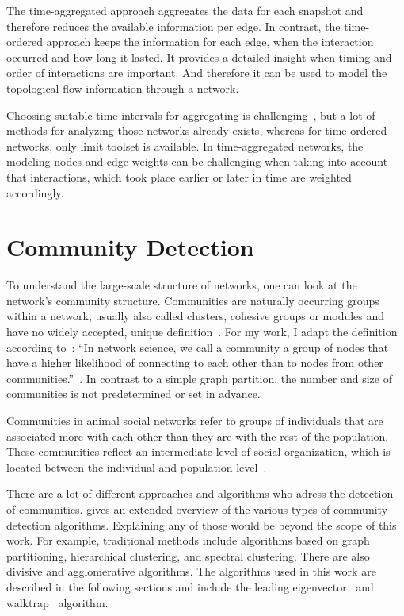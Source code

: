 The time-aggregated approach aggregates the data for each snapshot and therefore reduces the available information per edge. In contrast, the time-ordered approach keeps the information for each edge, when the interaction occurred and how long it lasted. It provides a detailed insight when timing and order of interactions are important.  And therefore it can be used to model the topological flow information through a network.

Choosing suitable time intervals for aggregating is challenging~\cite{Pinter-Wollman2014}, but a lot of methods for analyzing those networks already exists, whereas for time-ordered networks, only limit toolset is available. In time-aggregated networks, the modeling nodes and edge weights can be challenging when taking into account that interactions, which took place earlier or later in time are weighted accordingly.

\section{Community Detection}
To understand the large-scale structure of networks, one can look at the network's community structure. Communities are naturally occurring groups within a network, usually also called clusters, cohesive groups or modules and have no widely accepted, unique definition~\cite{palla2005uncovering}.
For my work, I adapt the definition according to~\textcite{barabasi2016network}: 
``In network science, we call a community a group of nodes that have a higher likelihood of connecting to each other than to nodes from other communities.''~\cite[p.~TODO]{barabasi2016network}. In contrast to a simple graph partition, the number and size of communities is not predetermined or set in advance.

Communities in animal social networks refer to groups of individuals that are associated more with each other than they are with the rest of the population. These communities reflect an intermediate level of social organization, which is located between the individual and population level~\cite{croft2008exploring}.

There are a lot of different approaches and algorithms who adress the detection of communities. \textcite{fortunato2010community} gives an extended overview of the various types of community detection algorithms.
Explaining any of those would be beyond the scope of this work. For example, traditional methods include algorithms based on graph partitioning, hierarchical clustering, and spectral clustering. There are also divisive and agglomerative algorithms.
The algorithms used in this work are described in the following sections and include the leading eigenvector~\cite{newman2006finding} and walktrap~\cite{pons2005computing} algorithm.

